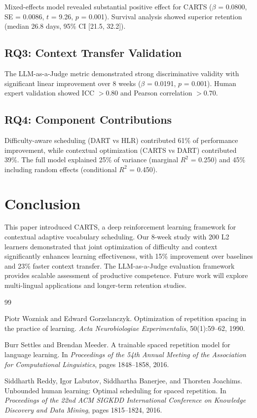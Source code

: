 \documentclass[11pt,a4paper]{article}
\begin{document}
Mixed-effects model revealed substantial positive effect for CARTS ($\beta$ = 0.0800, SE = 0.0086, $t$ = 9.26, $p$ = 0.001). Survival analysis showed superior retention (median 26.8 days, 95\% CI [21.5, 32.2]).

\subsection{RQ3: Context Transfer Validation}
The LLM-as-a-Judge metric demonstrated strong discriminative validity with significant linear improvement over 8 weeks ($\beta$ = 0.0191, $p$ = 0.001). Human expert validation showed ICC $> 0.80$ and Pearson correlation $> 0.70$.

\subsection{RQ4: Component Contributions}
Difficulty-aware scheduling (DART vs HLR) contributed 61\% of performance improvement, while contextual optimization (CARTS vs DART) contributed 39\%. The full model explained 25\% of variance (marginal $R^2$ = 0.250) and 45\% including random effects (conditional $R^2$ = 0.450).

\section{Conclusion}
This paper introduced CARTS, a deep reinforcement learning framework for contextual adaptive vocabulary scheduling. Our 8-week study with 200 L2 learners demonstrated that joint optimization of difficulty and context significantly enhances learning effectiveness, with 15\% improvement over baselines and 23\% faster context transfer. The LLM-as-a-Judge evaluation framework provides scalable assessment of productive competence. Future work will explore multi-lingual applications and longer-term retention studies.

\begin{thebibliography}{99}

Piotr Wozniak and Edward Gorzelanczyk.
\newblock Optimization of repetition spacing in the practice of learning.
\newblock \emph{Acta Neurobiologiae Experimentalis}, 50(1):59--62, 1990.

Burr Settles and Brendan Meeder.
\newblock A trainable spaced repetition model for language learning.
\newblock In \emph{Proceedings of the 54th Annual Meeting of the Association for Computational Linguistics}, pages 1848--1858, 2016.

Siddharth Reddy, Igor Labutov, Siddhartha Banerjee, and Thorsten Joachims.
\newblock Unbounded human learning: Optimal scheduling for spaced repetition.
\newblock In \emph{Proceedings of the 22nd ACM SIGKDD International Conference on Knowledge Discovery and Data Mining}, pages 1815--1824, 2016.

\end{thebibliography}
\end{document}
